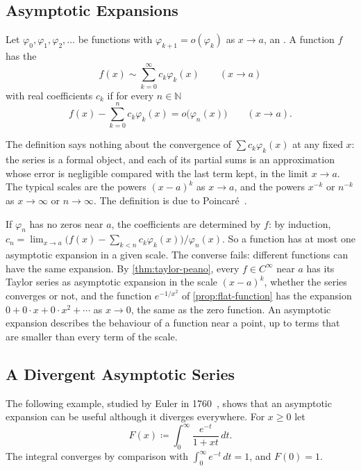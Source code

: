 \subsection{Asymptotic Expansions}

\begin{definition}
\label{def:asymptotic-expansion}
Let $\varphi_0,\varphi_1,\varphi_2,\ldots$ be functions with $\varphi_{k+1}=o(\varphi_k)$ as $x\to a$, an . A function $f$ has the 
\[
f(x)\sim\sum_{k=0}^\infty c_k\varphi_k(x)\qquad(x\to a)
\]
with real coefficients $c_k$ if for every $n\in\mathbb N$
\[
f(x)-\sum_{k=0}^nc_k\varphi_k(x)=o\bigl(\varphi_n(x)\bigr)\qquad(x\to a).
\]
\end{definition}

The definition says nothing about the convergence of $\sum c_k\varphi_k(x)$ at any fixed $x$: the series is a formal object, and each of its partial sums is an approximation whose error is negligible compared with the last term kept, in the limit $x\to a$. The typical scales are the powers $(x-a)^k$ as $x\to a$, and the powers $x^{-k}$ or $n^{-k}$ as $x\to\infty$ or $n\to\infty$. The definition is due to Poincar\'e~\cite{poincare1886}.

If $\varphi_n$ has no zeros near $a$, the coefficients are determined by $f$: by induction, $c_n=\lim_{x\to a}\bigl(f(x)-\sum_{k<n}c_k\varphi_k(x)\bigr)/\varphi_n(x)$. So a function has at most one asymptotic expansion in a given scale. The converse fails: different functions can have the same expansion. By \cref{thm:taylor-peano}, every $f\in C^\infty$ near $a$ has its Taylor series as asymptotic expansion in the scale $(x-a)^k$, whether the series converges or not, and the function $e^{-1/x^2}$ of \cref{prop:flat-function} has the expansion $0+0\cdot x+0\cdot x^2+\cdots$ as $x\to0$, the same as the zero function. An asymptotic expansion describes the behaviour of a function near a point, up to terms that are smaller than every term of the scale.

\subsection{A Divergent Asymptotic Series}

The following example, studied by Euler in 1760~\cite{barbeau1976}, shows that an asymptotic expansion can be useful although it diverges everywhere. For $x\ge0$ let
\begin{equation}
F(x)\coloneqq\int_0^\infty\frac{e^{-t}}{1+xt}\,dt .
\label{eq:euler-integral}
\end{equation}
The integral converges by comparison with $\int_0^\infty e^{-t}\,dt=1$, and $F(0)=1$.

